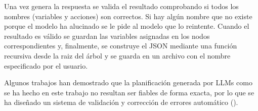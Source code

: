 Una vez genera la respuesta se valida el resultado comprobando si todos los nombres (variables y acciones) son correctos.
Si hay algún nombre que no existe porque el modelo ha alucinado se le pide al modelo que lo reintente.
Cuando el resultado es válido se guardan las variables asignadas en los nodos correspondientes y, finalmente, se construye el JSON mediante una función recursiva desde la raiz del árbol y se guarda en un archivo con el nombre especificado por el usuario.

Algunos trabajos han demostrado que la planificación generada por LLMs como se ha hecho en este trabajo no resultan ser fiables de forma exacta, por lo que se ha diseñado un sistema de validación y corrección de errores automático (\cite{PlanBench}).